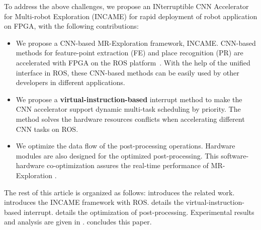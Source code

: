 To address the above challenges, we propose an INterruptible CNN Accelerator for Multi-robot Exploration (INCAME) for rapid deployment of robot application on FPGA, with the following contributions:

\begin{itemize}
\item We propose a CNN-based MR-Exploration framework, INCAME. CNN-based methods for feature-point extraction (FE) and place recognition (PR) are accelerated with FPGA on the ROS platform~\cite{quigley2009ros}. With the help of the unified interface in ROS, these CNN-based methods can be easily used by other developers in different applications.
\item We propose a \textbf{virtual-instruction-based} interrupt method to make the CNN accelerator support dynamic multi-task scheduling by priority. The method solves the hardware resources conflicts when accelerating different CNN tasks on ROS.
\item We optimize the data flow of the post-processing operations. Hardware modules are also designed for the optimized post-processing. This software-hardware co-optimization assures the real-time performance of MR-Exploration .
\end{itemize}

The rest of this article is organized as follows:  introduces the related work.  introduces the INCAME framework with ROS.  details the {virtual-instruction-based} interrupt.  details the optimization of post-processing. Experimental results and analysis are given in .  concludes this paper.